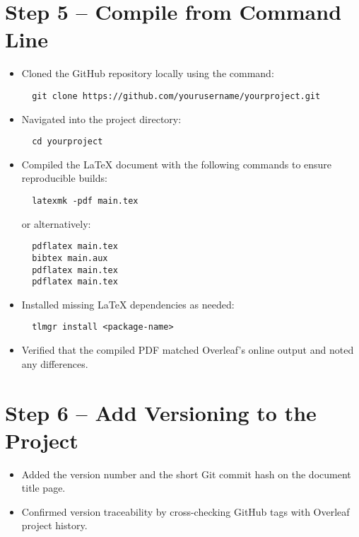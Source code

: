 \section{Step 5 – Compile from Command Line}
\begin{itemize}
  \item Cloned the GitHub repository locally using the command:
  \begin{verbatim}
  git clone https://github.com/yourusername/yourproject.git
  \end{verbatim}

  \item Navigated into the project directory:
  \begin{verbatim}
  cd yourproject
  \end{verbatim}

  \item Compiled the LaTeX document with the following commands to ensure reproducible builds:
  \begin{verbatim}
  latexmk -pdf main.tex
  \end{verbatim}
  or alternatively:
  \begin{verbatim}
  pdflatex main.tex
  bibtex main.aux
  pdflatex main.tex
  pdflatex main.tex
  \end{verbatim}

  \item Installed missing LaTeX dependencies as needed:
  \begin{verbatim}
  tlmgr install <package-name>
  \end{verbatim}

  \item Verified that the compiled PDF matched Overleaf’s online output and noted any differences.
\end{itemize}

\section{Step 6 – Add Versioning to the Project}
\begin{itemize}
  \item Added the version number and the short Git commit hash on the document title page.
  \item Confirmed version traceability by cross-checking GitHub tags with Overleaf project history.
\end{itemize}
